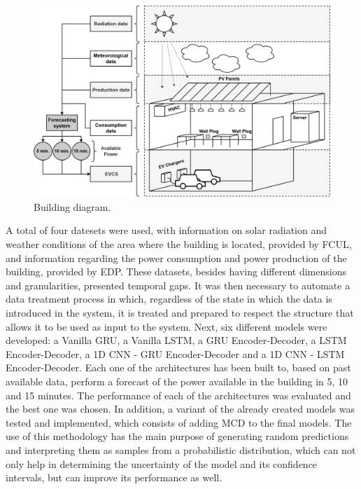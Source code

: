 \begin{figure}[h!]
    \centering
    \begin{center}
    \includegraphics[width=1\textwidth]{Images/BUILDING.png}
    \caption{Building diagram.}
    \label{building}
    \end{center}
\end{figure}


A total of four datesets were used, with information on solar radiation and weather conditions of the area where the building is located, provided by \ac{FCUL}, and information regarding the power consumption and power production of the building, provided by \ac{EDP}. These datasets, besides having different dimensions and granularities, presented temporal gaps. It was then necessary to automate a data treatment process in which, regardless of the state in which the data is introduced in the system, it is treated and prepared to respect the structure that allows it to be used as input to the system. Next, six different models were developed: a Vanilla \ac{GRU}, a Vanilla \ac{LSTM}, a \ac{GRU} Encoder-Decoder, a \ac{LSTM} Encoder-Decoder, a \ac{1D CNN} - \ac{GRU} Encoder-Decoder and a \ac{1D CNN} - \ac{LSTM} Encoder-Decoder. Each one of the architectures has been built to, based on past available data, perform a forecast of the power available in the building in 5, 10 and 15 minutes. The performance of each of the architectures was evaluated and the best one was chosen. In addition, a variant of the already created models was tested and implemented, which consists of adding \ac{MCD} to the final models. The use of this methodology has the main purpose of generating random predictions and interpreting them as samples from a probabilistic distribution, which can not only help in determining the uncertainty of the model and its confidence intervals, but can improve its performance as well. 

